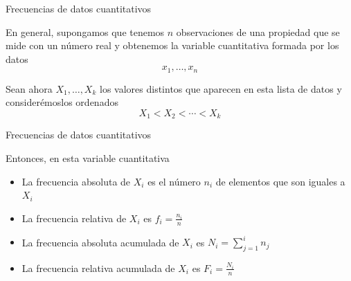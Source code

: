 \documentclass[
  ignorenonframetext,
]{beamer}
\providecommand{\tightlist}{%
  \setlength{\itemsep}{0pt}\setlength{\parskip}{0pt}}
\begin{document}
\begin{frame}{Frecuencias de datos cuantitativos}
\protect\hypertarget{frecuencias-de-datos-cuantitativos-1}{}

En general, supongamos que tenemos \(n\) observaciones de una propiedad
que se mide con un número real y obtenemos la variable cuantitativa
formada por los datos \[x_1,\dots, x_n\]

Sean ahora \(X_1,\dots,X_k\) los valores distintos que aparecen en esta
lista de datos y considerémoslos ordenados \[X_1<X_2<\cdots<X_k\]

\end{frame}

\begin{frame}{Frecuencias de datos cuantitativos}
\protect\hypertarget{frecuencias-de-datos-cuantitativos-2}{}

Entonces, en esta variable cuantitativa

\begin{itemize}
\tightlist
\item
  La frecuencia absoluta de \(X_i\) es el número \(n_i\) de elementos
  que son iguales a \(X_i\)
\item
  La frecuencia relativa de \(X_i\) es \(f_i=\frac{n_i}{n}\)
\item
  La frecuencia absoluta acumulada de \(X_i\) es \(N_i=\sum_{j=1}^in_j\)
\item
  La frecuencia relativa acumulada de \(X_i\) es \(F_i=\frac{N_i}{n}\)
\end{itemize}

\end{frame}
\end{document}
